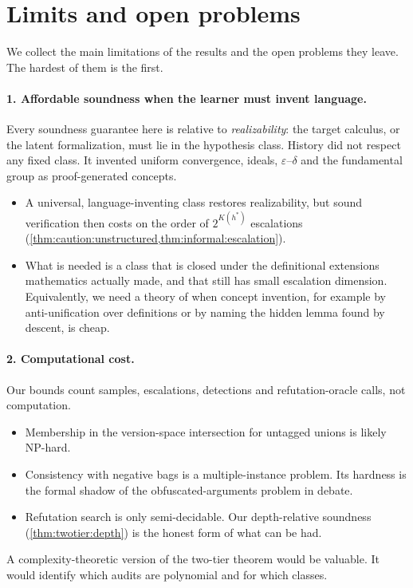 \section{Limits and open problems}\label{sec:open}

We collect the main limitations of the results and the open problems they leave. The hardest of them is the first.

\paragraph{1. Affordable soundness when the learner must invent language.} Every soundness guarantee here is relative to \emph{realizability}: the target calculus, or the latent formalization, must lie in the hypothesis class. History did not respect any fixed class. It invented uniform convergence, ideals, $\varepsilon$--$\delta$ and the fundamental group as proof-generated concepts.
\begin{itemize}
\item A universal, language-inventing class restores realizability, but sound verification then costs on the order of $2^{K(h^*)}$ escalations (\cref{thm:caution:unstructured,thm:informal:escalation}).
\item What is needed is a class that is closed under the definitional extensions mathematics actually made, and that still has small escalation dimension. Equivalently, we need a theory of when concept invention, for example by anti-unification over definitions or by naming the hidden lemma found by descent, is cheap.
\end{itemize}

\paragraph{2. Computational cost.} Our bounds count samples, escalations, detections and refutation-oracle calls, not computation.
\begin{itemize}
\item Membership in the version-space intersection for untagged unions is likely NP-hard.
\item Consistency with negative bags is a multiple-instance problem. Its hardness is the formal shadow of the obfuscated-arguments problem in debate.
\item Refutation search is only semi-decidable. Our depth-relative soundness (\cref{thm:twotier:depth}) is the honest form of what can be had.
\end{itemize}
A complexity-theoretic version of the two-tier theorem would be valuable. It would identify which audits are polynomial and for which classes.

